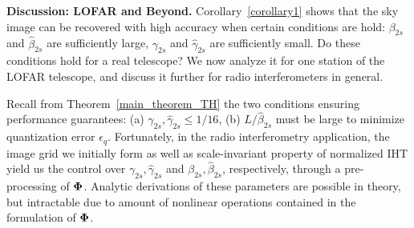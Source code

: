 \documentclass{article}
\begin{document}
{\bf Discussion: LOFAR and Beyond.}
Corollary~\ref{corollary1} shows that the sky image 
can be recovered with high accuracy when certain conditions are hold:
${\beta}_{2s}$ and $\hat{\beta}_{2s}$ are sufficiently large, ${\gamma}_{2s}$ and $\hat{\gamma}_{2s}$
are sufficiently small. Do these conditions hold for a real telescope? We now analyze it for one station of the LOFAR telescope, and discuss it further for radio interferometers in general.

 Recall from Theorem~\ref{main_theorem_TH} the two conditions ensuring  performance guarantees: (a) $\gamma_{2s}, \hat{\gamma}_{2s} \leq 1/16$, (b) ${L}/{\hat{\beta}_{2s}}$ must be large to minimize quantization error $ {\epsilon}_q$. Fortunately, in the radio interferometry application, the image grid we initially form as well as scale-invariant property of normalized IHT yield us the control over $\gamma_{2s}, \hat{\gamma}_{2s}$ and ${\beta}_{2s}, \hat{\beta}_{2s}$, respectively, through a pre-processing of ${\bf \Phi}$. Analytic derivations of these parameters are possible in theory, but intractable due to amount of nonlinear operations contained in the formulation of ${\bf \Phi}$. 
\end{document}
